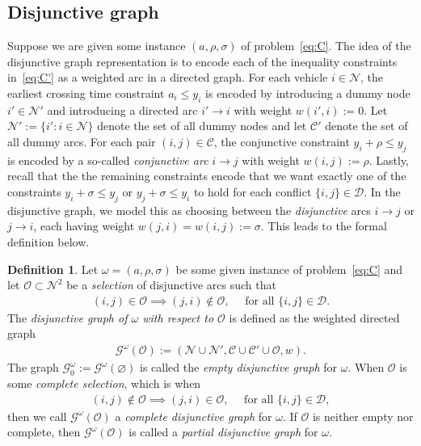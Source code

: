 \documentclass{report}
\theoremstyle{definition}
\newtheorem{define}{Definition}[chapter]
\theoremstyle{plain}
\begin{document}
\subsection{Disjunctive graph}

Suppose we are given some instance $(a, \rho, \sigma)$ of
problem~\eqref{eq:C}.
%
The idea of the disjunctive graph representation is to encode each of the
inequality constraints in~\eqref{eq:C'} as a weighted arc in a directed graph.
%
For each vehicle $i \in \mathcal{N}$, the earliest crossing time constraint
  $a_i \leq y_i$
is encoded by introducing a dummy node $i' \in \mathcal{N}'$ and introducing a
directed arc $i' \rightarrow i$ with weight $w(i', i) := 0$.
%
Let $\mathcal{N}' := \{ i' : i \in \mathcal{N}\}$ denote the set of all dummy
nodes and let $\mathcal{C}'$ denote the set of all dummy arcs.
%
For each pair $(i,j) \in \mathcal{C}$, the conjunctive constraint
  $y_i + \rho \leq y_j$
is encoded by a so-called \emph{conjunctive arc} $i \rightarrow j$ with weight
$w(i,j) := \rho$.
%
Lastly, recall that the the remaining constraints encode that we want exactly
one of the constraints $y_i + \sigma \leq y_j$ or $y_j + \sigma \leq y_i$ to
hold for each conflict $\{i,j\} \in \mathcal{D}$.
%
In the disjunctive graph, we model this as choosing between the
\emph{disjunctive} arcs $i \rightarrow j$ or $j \rightarrow i$, each having
weight $w(j,i) = w(i,j) := \sigma$.
%
This leads to the formal definition below.

\begin{define}
  Let $\omega=(a, \rho, \sigma)$ be some given instance of
  problem~\eqref{eq:C} and let $\mathcal{O} \subset \mathcal{N}^2$ be a
  \emph{selection} of disjunctive arcs such that
  \begin{align}\tag{dg.1}
    (i,j) \in \mathcal{O} \implies (j, i) \notin \mathcal{O} , \quad \text{ for all } \{i,j\} \in \mathcal{D} .
  \end{align}
  The \emph{disjunctive graph of $\omega$ with respect to $\mathcal{O}$} is defined
  as the weighted directed graph
  \begin{align}\tag{dg.2}
    \mathcal{G}^\omega(\mathcal{O}) := (\mathcal{N} \cup \mathcal{N}', \mathcal{C} \cup \mathcal{C}' \cup \mathcal{O}, w) .
  \end{align}
  The graph $\mathcal{G}_0^\omega := \mathcal{G}^\omega(\varnothing)$ is called the
  \emph{empty disjunctive graph} for $\omega$.
  When $\mathcal{O}$ is some \emph{complete selection}, which is when
  \begin{align}\tag{dg.3}
    (i,j) \notin \mathcal{O} \implies (j, i) \in \mathcal{O},  \quad \text{ for all } \{i,j\} \in \mathcal{D} ,
  \end{align}
  then we call $\mathcal{G}^\omega(\mathcal{O})$ a \emph{complete disjunctive graph}
  for $\omega$.
  If $\mathcal{O}$ is neither empty nor complete, then
  $\mathcal{G}^\omega(\mathcal{O})$ is called a \emph{partial disjunctive graph} for
  $\omega$.
\end{define}
\end{document}
